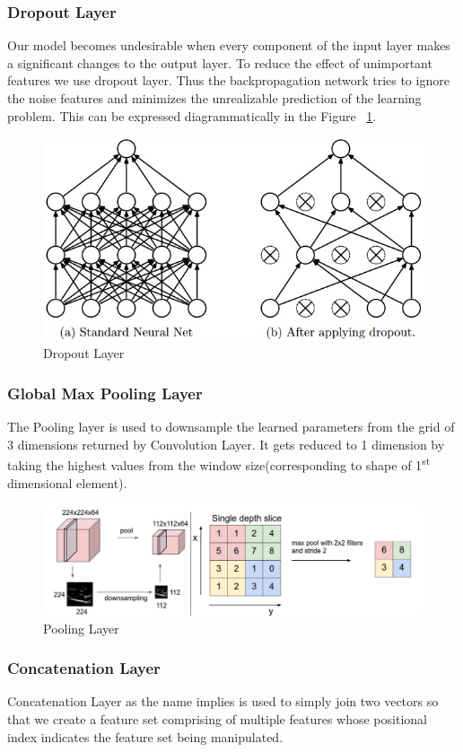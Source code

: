 \subsubsection{Dropout Layer}
Our model becomes undesirable when every component of the input layer makes a significant changes to the output layer. To reduce the effect of unimportant features we use dropout layer. Thus the backpropagation network tries to ignore the noise features and minimizes the unrealizable prediction of the learning problem. This can be expressed diagrammatically in the Figure ~\ref{fig:dropout}.
\begin{figure}
  [ht] \centering
  \includegraphics[width=.5\linewidth]{mainmatter/3-Methodology/images/dropout.jpeg}
  \caption{Dropout Layer}
  \label{fig:dropout}

\end{figure}

\subsubsection{Global Max Pooling Layer}
The Pooling layer is used to downsample the learned parameters from the grid of 3 dimensions returned by Convolution Layer. It gets reduced to 1 dimension by taking the highest values from the window size(corresponding to shape of 1\textsuperscript{st} dimensional element).
\begin{figure}
  [ht]\centering
  \includegraphics[width=.75\linewidth]{mainmatter/3-Methodology/images/pooling.png}
  \caption{Pooling Layer}
  \label{fig:pool_layer}
\end{figure}

\subsubsection{Concatenation Layer}
Concatenation Layer as the name implies is used to simply join two vectors so that we create a feature set comprising of multiple features whose positional index indicates the feature set being manipulated.

